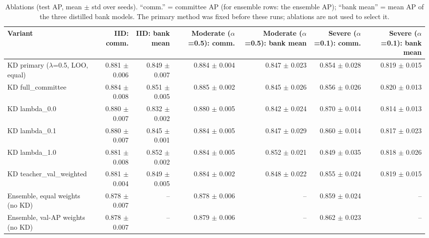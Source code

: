\begin{table}[t]
\centering
\scriptsize
\caption{Ablations (test AP, mean $\pm$ std over seeds). ``comm.'' = committee AP (for ensemble rows: the ensemble AP); ``bank mean'' = mean AP of the three distilled bank models. The primary method was fixed before these runs; ablations are not used to select it.}
\label{tab:ablations}
\begin{tabular}{lrrrrrr}
\toprule
Variant & IID: comm. & IID: bank mean & Moderate ($\alpha$=0.5): comm. & Moderate ($\alpha$=0.5): bank mean & Severe ($\alpha$=0.1): comm. & Severe ($\alpha$=0.1): bank mean \\
\midrule
KD primary ($\lambda$=0.5, LOO, equal) & 0.881 $\pm$ 0.006 & 0.849 $\pm$ 0.007 & 0.884 $\pm$ 0.004 & 0.847 $\pm$ 0.023 & 0.854 $\pm$ 0.028 & 0.819 $\pm$ 0.015 \\
KD full\_committee & 0.884 $\pm$ 0.008 & 0.851 $\pm$ 0.005 & 0.885 $\pm$ 0.002 & 0.845 $\pm$ 0.026 & 0.856 $\pm$ 0.026 & 0.820 $\pm$ 0.013 \\
KD lambda\_0.0 & 0.880 $\pm$ 0.007 & 0.832 $\pm$ 0.002 & 0.880 $\pm$ 0.005 & 0.842 $\pm$ 0.024 & 0.870 $\pm$ 0.014 & 0.814 $\pm$ 0.013 \\
KD lambda\_0.1 & 0.880 $\pm$ 0.007 & 0.845 $\pm$ 0.001 & 0.884 $\pm$ 0.005 & 0.847 $\pm$ 0.029 & 0.860 $\pm$ 0.014 & 0.817 $\pm$ 0.023 \\
KD lambda\_1.0 & 0.881 $\pm$ 0.008 & 0.852 $\pm$ 0.002 & 0.884 $\pm$ 0.005 & 0.852 $\pm$ 0.021 & 0.849 $\pm$ 0.035 & 0.818 $\pm$ 0.026 \\
KD teacher\_val\_weighted & 0.881 $\pm$ 0.004 & 0.849 $\pm$ 0.005 & 0.884 $\pm$ 0.002 & 0.848 $\pm$ 0.022 & 0.855 $\pm$ 0.024 & 0.819 $\pm$ 0.015 \\
Ensemble, equal weights (no KD) & 0.878 $\pm$ 0.007 & -- & 0.878 $\pm$ 0.006 & -- & 0.859 $\pm$ 0.024 & -- \\
Ensemble, val-AP weights (no KD) & 0.878 $\pm$ 0.007 & -- & 0.879 $\pm$ 0.006 & -- & 0.862 $\pm$ 0.023 & -- \\
\bottomrule
\end{tabular}
\end{table}
